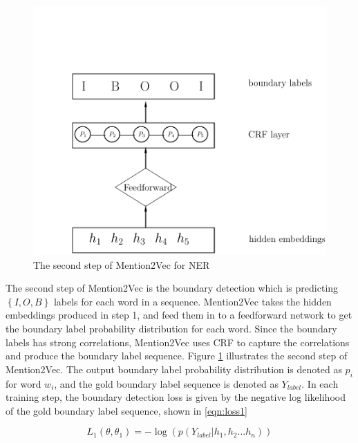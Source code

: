 \begin{figure}
  \centering
  \includegraphics[scale=0.6]{mention2vec2.pdf}
 \caption{The second step of Mention2Vec for NER}
  \label{fig:mention2vec2}
\end{figure}

The second step of Mention2Vec is the boundary detection which is predicting $\left\{I, O, B\right\}$ labels for each word in a sequence. Mention2Vec takes the hidden embeddings produced in step 1, and feed them in to a feedforward network to get the boundary label probability distribution for each word. Since the boundary labels has strong correlations, Mention2Vec uses CRF to capture the correlations and produce the boundary label sequence. Figure \ref{fig:mention2vec2} illustrates the second step of Mention2Vec. The output boundary label probability distribution is denoted as $p_{i}$ for word $w_{i}$, and the gold boundary label sequence is denoted as $Y_{label}$. In each training step, the boundary detection loss is given by the negative log likelihood of the gold boundary label sequence, shown in \ref{eqn:loss1}

\begin{equation}\label{eqn:loss1}
  L_{1}\left( \theta ,\theta _{1}\right) =-\log \left( p\left( Y_{label}|h_{1}, h_{2} \dots h_{n}\right) \right) 
\end{equation}

